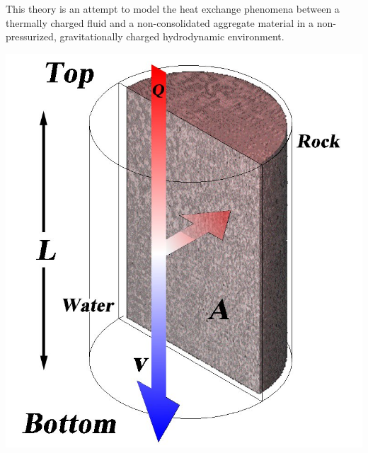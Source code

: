 \documentclass[a4paper,10pt]{scrbook}
\begin{document}
This theory is an attempt to model the heat exchange phenomena between a thermally charged fluid and a non-consolidated aggregate material in a non-pressurized, gravitationally charged hydrodynamic environment.

\begin{center}
 \includegraphics[scale=0.2]{theorySlab.jpg}
\end{center}
\end{document}
